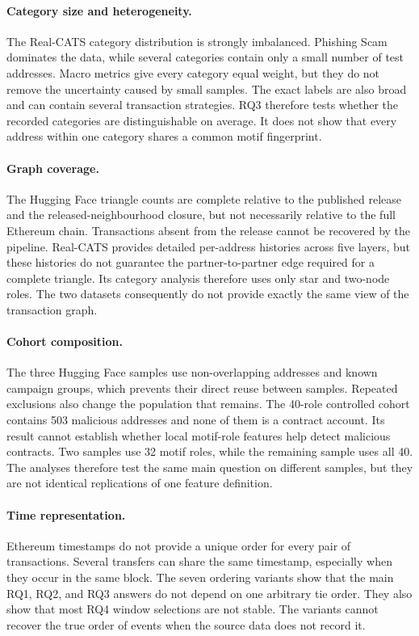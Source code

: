 \documentclass{thesisclass}
\begin{document}
\paragraph{Category size and heterogeneity.}
The Real-CATS category distribution is strongly imbalanced. Phishing Scam
dominates the data, while several categories contain only a small number of test
addresses. Macro metrics give every category equal weight, but they do not remove
the uncertainty caused by small samples. The exact labels are also broad and can
contain several transaction strategies. RQ3 therefore tests whether the recorded
categories are distinguishable on average. It does not show that every address
within one category shares a common motif fingerprint.

\paragraph{Graph coverage.}
The Hugging Face triangle counts are complete relative to the published release
and the released-neighbourhood closure, but not necessarily relative to the full
Ethereum chain. Transactions absent from the release cannot be recovered by the
pipeline. Real-CATS provides detailed per-address histories across five layers,
but these histories do not guarantee the partner-to-partner edge required for a
complete triangle. Its category analysis therefore uses only star and two-node
roles. The two datasets consequently do not provide exactly the same view of the
transaction graph.

\paragraph{Cohort composition.}
The three Hugging Face samples use non-overlapping addresses and known campaign
groups, which prevents their direct reuse between samples. Repeated exclusions
also change the population that remains. The 40-role controlled cohort
contains 503 malicious addresses and none of them is a contract account. Its
result cannot establish whether local motif-role features help detect malicious contracts.
Two samples use 32 motif roles, while the remaining sample uses all 40. The
analyses therefore test the same main question on different samples, but
they are not identical replications of one feature definition.

\paragraph{Time representation.}
Ethereum timestamps do not provide a unique order for every pair of transactions.
Several transfers can share the same timestamp, especially when they occur in
the same block. The seven ordering variants show that the main RQ1, RQ2, and RQ3
answers do not depend on one arbitrary tie order. They also show that most RQ4
window selections are not stable. The variants cannot recover the true order of
events when the source data does not record it.
\end{document}
